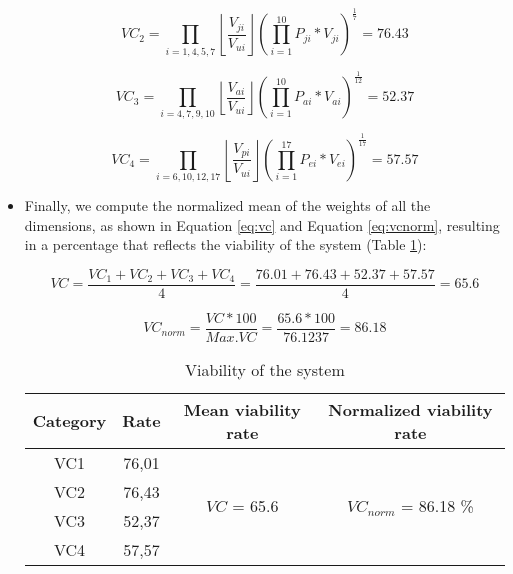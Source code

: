 \begin{itemize}
\begin{equation}
\label{eq:just}
VC_2 = \prod_{i=1,4,5,7}^{}\left \lfloor \frac{V_{ji}}{V_{ui}} \right \rfloor (\prod_{i=1}^{10}P_{ji} * V_{ji})^\frac{1}{7} = 76.43
\end{equation}

\begin{equation}
\label{eq:adeq}
VC_3 = \prod_{i=4,7,9,10}^{}\left \lfloor \frac{V_{ai}}{V_{ui}} \right \rfloor (\prod_{i=1}^{10}P_{ai} * V_{ai})^\frac{1}{12} = 52.37
\end{equation}

\begin{equation}
\label{eq:succ}
VC_4 = \prod_{i=6,10,12,17}^{}\left \lfloor \frac{V_{pi}}{V_{ui}} \right \rfloor (\prod_{i=1}^{17}P_{ei} * V_{ei})^\frac{1}{17} = 57.57
\end{equation}

\item Finally, we compute the normalized mean of the weights of all the dimensions, as shown in Equation \ref{eq:vc} and Equation \ref{eq:vcnorm}, resulting in a percentage that reflects the viability of the system (Table \ref{tb:viability}):


\begin{equation}
\label{eq:vc}
VC = \frac{VC_1 + VC_2 + VC_3 + VC_4}{4} = \frac{76.01 + 76.43 + 52.37 + 57.57}{4} = 65.6
\end{equation}

\begin{equation}
\label{eq:vcnorm}
VC_{norm} = \frac{VC * 100}{Max.VC} = \frac{65.6 * 100}{76.1237} = 86.18 %
\end{equation}

\begin{table}[]
	\centering
	\caption{Viability of the system}
	\label{tb:viability}
	\begin{tabular}{|c|c|c|c|}
	\hline
	\textbf{Category} & \textbf{Rate} & \textbf{Mean viability rate} & \textbf{Normalized viability rate} \\ \hline\hline
	VC1               & 76,01         & \multirow{4}{*}{$VC$ = 65.6}   & \multirow{4}{*}{$VC_{norm}$ = 86.18 \%} \\ \cline{1-2}
	VC2 & 76,43 &  &  \\ \cline{1-2}
	VC3 & 52,37 &  &  \\ \cline{1-2}
	VC4 & 57,57 &  &  \\ \hline
	\end{tabular}
\end{table}

\end{itemize}

